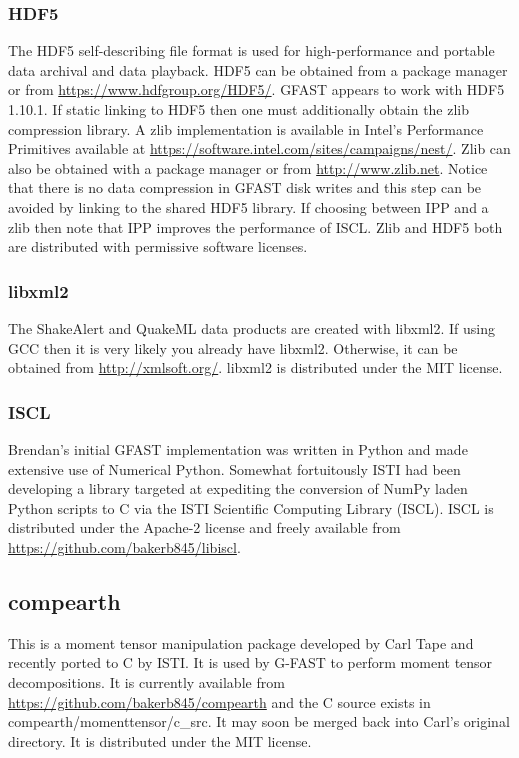 \documentclass[12pt]{article}
\begin{document}
\subsubsection{HDF5}
The HDF5 self-describing file format is used for high-performance and portable data archival and
data playback.  HDF5 can be obtained from a package manager or from 
\url{https://www.hdfgroup.org/HDF5/}. 
GFAST appears to work with HDF5 1.10.1.  If static linking to HDF5 then one must additionally 
obtain the zlib compression library.  A zlib implementation is available in Intel's 
Performance Primitives available at \url{https://software.intel.com/sites/campaigns/nest/}.  Zlib
can also be obtained with a package manager or from \url{http://www.zlib.net}.  
Notice that there is no data compression in GFAST disk writes and this step can be avoided by
linking to the shared HDF5 library.  If choosing between IPP and a zlib then note that
IPP improves the performance of ISCL.   Zlib and HDF5 both are distributed with permissive
software licenses.

\subsubsection{libxml2}
The ShakeAlert and QuakeML data products are created with libxml2.  If using GCC then it
is very likely you already have libxml2.  Otherwise, it can be obtained from 
\url{http://xmlsoft.org/}.  libxml2 is distributed under the MIT license. 

\subsubsection{ISCL}
Brendan's initial GFAST implementation was written in Python and made extensive use of 
Numerical Python.  Somewhat fortuitously ISTI had been developing a library targeted 
at expediting the conversion of NumPy laden Python scripts to C via the ISTI Scientific
Computing Library (ISCL).  ISCL is distributed under the Apache-2 license and 
freely available from \url{https://github.com/bakerb845/libiscl}.

\subsection{compearth}
This is a moment tensor manipulation package developed by Carl Tape and recently ported to C by ISTI. 
It is used by G-FAST to perform moment tensor decompositions.
It is currently available from \url{https://github.com/bakerb845/compearth} and the C source exists in compearth/momenttensor/c\_src.  
It may soon be merged back into Carl's original directory.  It is distributed under the MIT license.
\end{document}
